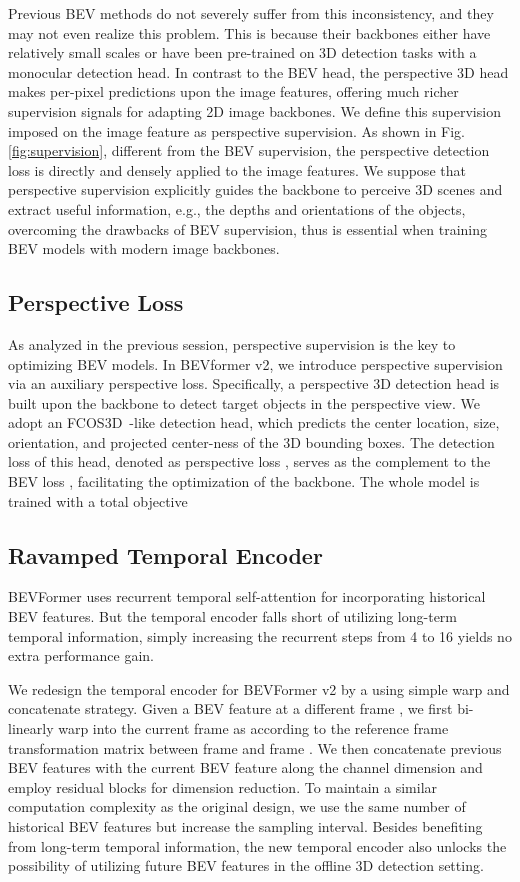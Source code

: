 \documentclass[10pt,twocolumn,letterpaper]{article}
\begin{document}
Previous BEV methods do not severely suffer from this inconsistency, and they may not even realize this problem. 
This is because their backbones either have relatively small scales or have been pre-trained on 3D detection tasks with a monocular detection head. 
In contrast to the BEV head, the perspective 3D head makes per-pixel predictions upon the image features, offering much richer supervision signals for adapting 2D image backbones. 
We define this supervision imposed on the image feature as perspective supervision. 
As shown in Fig. \ref{fig:supervision}, different from the BEV supervision, the perspective detection loss is directly and densely applied to the image features. 
We suppose that perspective supervision explicitly guides the backbone to perceive 3D scenes and extract useful information, e.g., the depths and orientations of the objects, overcoming the drawbacks of BEV supervision, thus is essential when training BEV models with modern image backbones.

\subsection{Perspective Loss}
As analyzed in the previous session, perspective supervision is the key to optimizing BEV models. 
In BEVformer v2, we introduce perspective supervision via an auxiliary perspective loss. 
Specifically, a perspective 3D detection head is built upon the backbone to detect target objects in the perspective view. 
We adopt an FCOS3D~\cite{fcos3d}-like detection head, which predicts the center location, size, orientation, and projected center-ness of the 3D bounding boxes. 
The detection loss of this head, denoted as perspective loss , serves as the complement to the BEV loss , facilitating the optimization of the backbone. 
The whole model is trained with a total objective


\subsection{Ravamped Temporal Encoder}
BEVFormer uses recurrent temporal self-attention for incorporating historical BEV features.
But the temporal encoder falls short of utilizing long-term temporal information, simply increasing the recurrent steps from 4 to 16 yields no extra performance gain.

We redesign the temporal encoder for BEVFormer v2 by a using simple warp and concatenate strategy.
Given a BEV feature  at a different frame , we first bi-linearly warp  into the current frame as  according to the reference frame transformation matrix  between frame  and frame . 
We then concatenate previous BEV features with the current BEV feature along the channel dimension and employ residual blocks for dimension reduction.
To maintain a similar computation complexity as the original design, we use the same number of historical BEV features but increase the sampling interval.
Besides benefiting from long-term temporal information, the new temporal encoder also unlocks the possibility of utilizing future BEV features in the offline 3D detection setting.
\end{document}
